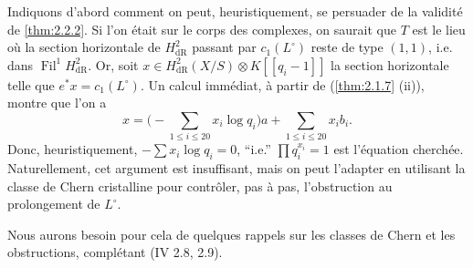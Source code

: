 \documentclass[12pt,a4paper]{article}
\theoremstyle{plain}
\theoremstyle{definition}
\theoremstyle{remark}
\DeclareMathOperator{\Fil}{Fil}
\begin{document}
\subsubsection{}
Indiquons d'abord comment on peut, heuristiquement, se persuader de la validit\'e de \ref{thm:2.2.2}. Si l'on \'etait sur le corps des complexes, on saurait que $T$ est le lieu o\`u la section horizontale de $H^2_\mathrm{dR}$ passant par $c_1(L^\circ)$ reste de type $(1,1)$, i.e. dans $\Fil^1 H^2_\mathrm{dR}$. Or, soit $x \in H^2_\mathrm{dR}(X/S) \otimes K[[q_i - 1]]$ la section horizontale telle que $e^*x = c_1(L^\circ)$. Un calcul imm\'ediat, \`a partir de (\ref{thm:2.1.7} (ii)), montre que l'on a
\begin{equation}\tag{2.2.3.1}
x = \bigl(-\sum_{1\leqslant i\leqslant 20} x_i \log q_i\bigr)a + \sum_{1\leqslant i\leqslant 20} x_i b_i. 
\end{equation}
Donc, heuristiquement, $-\sum x_i \log q_i = 0$, ``i.e.'' $\prod q_i^{x_i} = 1$ est l'\'equation cherch\'ee. Naturellement, cet argument est insuffisant, mais on peut l'adapter en utilisant la classe de Chern cristalline pour contr\^oler, pas \`a pas, l'obstruction au prolongement de $L^\circ$.

Nous aurons besoin pour cela de quelques rappels sur les classes de Chern et les obstructions, compl\'etant (IV 2.8, 2.9).
\end{document}
